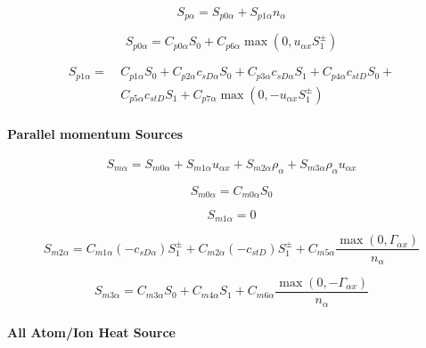 \documentclass[a4paper,10pt]{report}
\begin{document}
\begin{equation}
S_{p\alpha}=S_{p0\alpha}+S_{p1\alpha}n_{\alpha}   \label{67}
\end{equation}

\begin{equation}
S_{p0\alpha}=C_{p0\alpha}S_{0}+C_{p6\alpha}
\max\left( 0,u_{\alpha x}S_{1}^{\pm}\right)   \label{68}
\end{equation}

\begin{equation}\begin{split}
S_{p1\alpha}= ~ &C_{p1\alpha}S_{0}+C_{p2\alpha}c_{sD\alpha}S_{0}+C_{p3\alpha}
c_{sD\alpha}S_{1}+C_{p4\alpha}c_{stD}S_{0}+ \\
~ & C_{p5\alpha}c_{stD}S_{1}+C_{p7\alpha}\max\left( 0,-u_{\alpha x}S_{1}^{\pm}\right)   \label{69}
\end{split}\end{equation}

\paragraph{Parallel momentum Sources}

\begin{equation}
S_{m\alpha}=S_{m0\alpha}+S_{m1\alpha}u_{\alpha x}+S_{m2\alpha}\rho_{\alpha}
+S_{m3\alpha}\rho_{\alpha}u_{\alpha x}   \label{70}
\end{equation}

\begin{equation}
S_{m0\alpha}=C_{m0\alpha}S_{0}   \label{71}
\end{equation}

\begin{equation}
S_{m1\alpha}=0   \label{72}
\end{equation}

\begin{equation}
S_{m2\alpha}=C_{m1\alpha}\left( -c_{sD\alpha}\right)
S_{1}^{\pm}+C_{m2\alpha}\left( -c_{stD}\right) S_{1}^{\pm}+C_{m5\alpha}
\frac{\max\left( 0,\Gamma_{\alpha x}\right) }{n_{\alpha}}   \label{73}
\end{equation}

\begin{equation}
S_{m3\alpha}=C_{m3\alpha}S_{0}+C_{m4\alpha}S_{1}+C_{m6\alpha}
\frac{\max\left( 0,-\Gamma_{\alpha x}\right) }{n_{\alpha}}   \label{74}
\end{equation}

\paragraph{All Atom/Ion Heat Source}
\end{document}

